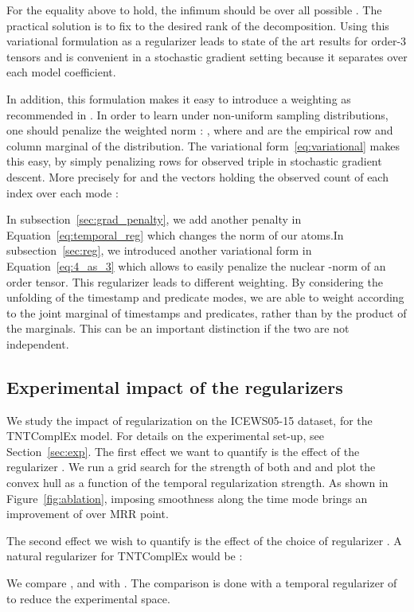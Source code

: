 \documentclass{article}
\begin{document}
For the equality above to hold, the infimum should be over all possible . The practical solution is to fix  to the desired rank of the decomposition. Using this variational formulation as a regularizer leads to state of the art results for order-3 tensors \citep{lacroix2018canonical} and is convenient in a stochastic gradient setting because it separates over each model coefficient.

In addition, this formulation makes it easy to introduce a weighting as recommended in \citet{srebro_collaborative_2010, foygel_learning_2011}. In order to learn under non-uniform sampling distributions, one should penalize the weighted norm : , where  and  are the empirical row and column marginal of the distribution. The variational form~\eqref{eq:variational} makes this easy, by simply penalizing rows  for observed triple  in stochastic gradient descent. More precisely for  and  the vectors holding the observed count of each index over each mode :


In subsection~\ref{sec:grad_penalty}, we add another penalty in Equation~\eqref{eq:temporal_reg} which changes the norm of our atoms.In subsection~\ref{sec:reg}, we introduced another variational form in Equation~\eqref{eq:4_as_3} which allows to easily penalize the nuclear -norm of an order  tensor. This regularizer leads to different weighting. By considering the unfolding of the timestamp and predicate modes, we are able to weight according to the joint marginal of timestamps and predicates, rather than by the product of the marginals. This can be an important distinction if the two are not independent.

\subsection{Experimental impact of the regularizers}
We study the impact of regularization on the ICEWS05-15 dataset, for the TNTComplEx model. For details on the experimental set-up, see Section~\ref{sec:exp}. The first effect we want to quantify is the effect of the regularizer . We run a grid search for the strength of both  and  and plot the convex hull as a function of the temporal regularization strength. As shown in Figure~\ref{fig:ablation}, imposing smoothness along the time mode brings an improvement of over  MRR point.

The second effect we wish to quantify is the effect of the choice of regularizer . A natural regularizer for TNTComplEx would be : 

We compare ,  and  with . The comparison is done with a temporal regularizer of  to reduce the experimental space.
\end{document}
